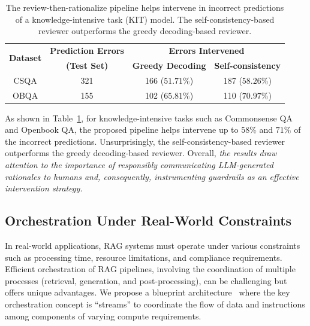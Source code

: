  \begin{table}[!htb]
\scriptsize
\centering
\begin{tabular}{cccc}
\hline
\multicolumn{1}{c}{\multirow{2}{*}{\textbf{Dataset}}} & \multicolumn{1}{c}{\textbf{Prediction Errors}} & \multicolumn{2}{c}{\textbf{Errors Intervened}}                                                \\ \cline{3-4} 
\multicolumn{1}{c}{}                                  & \multicolumn{1}{c}{\textbf{(Test Set)}}        & \multicolumn{1}{c}{\textbf{Greedy Decoding}} & \multicolumn{1}{c}{\textbf{Self-consistency}} \\ \hline
CSQA                                                    & 321                                             & \multicolumn{1}{c}{166 ($51.71\%$)}                     & 187 ($\mathbf{58.26\%}$)                                        \\ %
OBQA                                                    & 155                                             & \multicolumn{1}{c}{102 ($65.81\%$)}                     & 110 ($\mathbf{70.97\%}$)                                         \\ \hline
\end{tabular}
\caption{The review-then-rationalize pipeline helps intervene in incorrect predictions of a knowledge-intensive task (KIT) model. The self-consistency-based reviewer outperforms the greedy decoding-based reviewer.}
\label{tab:review}
\end{table}

As shown in Table~\ref{tab:review}, for knowledge-intensive tasks such as Commonsense QA and Openbook QA, the proposed pipeline helps intervene up to $58\%$ and $71\%$ of the incorrect predictions. Unsurprisingly, the self-consistency-based reviewer outperforms the greedy decoding-based reviewer. Overall, \emph{the results draw attention to the importance of responsibly communicating LLM-generated rationales to humans and, consequently, instrumenting guardrails as an effective intervention strategy.} 

\subsection{Orchestration Under Real-World Constraints}
\label{sec:blue-orchestration}
In real-world applications, RAG systems must operate under various constraints such as processing time, resource limitations, and compliance requirements. Efficient orchestration of RAG pipelines, involving the coordination of multiple processes (retrieval, generation, and post-processing), can be challenging but offers unique advantages.
%
We propose a blueprint architecture~\cite{kandogan2024blueprint} where the key orchestration concept is ``streams'' to coordinate the flow of data and instructions among components of varying compute requirements.



